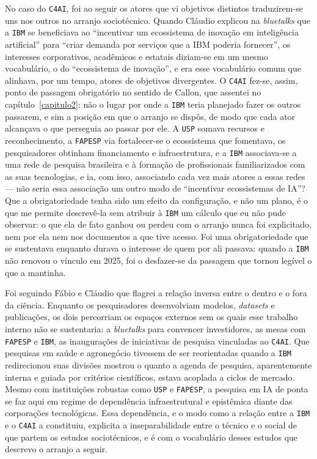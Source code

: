 No caso do \texttt{C4AI}, foi ao seguir os atores que vi objetivos distintos traduzirem-se uns nos outros no arranjo sociotécnico. Quando Cláudio explicou na \textit{bluetalks} que a \texttt{IBM} se beneficiava ao \enquote{incentivar um ecossistema de inovação em inteligência artificial} para \enquote{criar demanda por serviços que a IBM poderia fornecer}, os interesses corporativos, acadêmicos e estatais diziam-se em um mesmo vocabulário, o do \enquote{ecossistema de inovação}, e era esse vocabulário comum que alinhava, por um tempo, atores de objetivos divergentes. O \texttt{C4AI} fez-se, assim, ponto de passagem obrigatório no sentido de Callon, que assentei no capítulo~\ref{capitulo2}: não o lugar por onde a \texttt{IBM} teria planejado fazer os outros passarem, e sim a posição em que o arranjo se dispôs, de modo que cada ator alcançava o que perseguia ao passar por ele. A \texttt{USP} somava recursos e reconhecimento, a \texttt{FAPESP} via fortalecer-se o ecossistema que fomentava, os pesquisadores obtinham financiamento e infraestrutura, e a \texttt{IBM} associava-se a uma rede de pesquisa brasileira e à formação de profissionais familiarizados com as suas tecnologias, e ia, com isso, associando cada vez mais atores a essas redes --- não seria essa associação um outro modo de \enquote{incentivar ecossistemas de IA}? Que a obrigatoriedade tenha sido um efeito da configuração, e não um plano, é o que me permite descrevê-la sem atribuir à \texttt{IBM} um cálculo que eu não pude observar: o que ela de fato ganhou ou perdeu com o arranjo nunca foi explicitado, nem por ela nem nos documentos a que tive acesso. Foi uma obrigatoriedade que se sustentava enquanto durava o interesse de quem por ali passava: quando a \texttt{IBM} não renovou o vínculo em 2025, foi o desfazer-se da passagem que tornou legível o que a mantinha.

Foi seguindo Fábio e Cláudio que flagrei a relação inversa entre o dentro e o fora da ciência. Enquanto os pesquisadores desenvolviam modelos, \textit{datasets} e publicações, os dois percorriam os espaços externos sem os quais esse trabalho interno não se sustentaria: a \textit{bluetalks} para convencer investidores, as mesas com \texttt{FAPESP} e \texttt{IBM}, as inaugurações de iniciativas de pesquisa vinculadas ao \texttt{C4AI}. Que pesquisas em saúde e agronegócio tivessem de ser reorientadas quando a \texttt{IBM} redirecionou suas divisões mostrou o quanto a agenda de pesquisa, aparentemente interna e guiada por critérios científicos, estava acoplada a ciclos de mercado. Mesmo com instituições robustas como \texttt{USP} e \texttt{FAPESP}, a pesquisa em IA de ponta se faz aqui em regime de dependência infraestrutural e epistêmica diante das corporações tecnológicas. Essa dependência, e o modo como a relação entre a \texttt{IBM} e o \texttt{C4AI} a constituiu, explicita a inseparabilidade entre o técnico e o social de que partem os estudos sociotécnicos, e é com o vocabulário desses estudos que descrevo o arranjo a seguir. 

